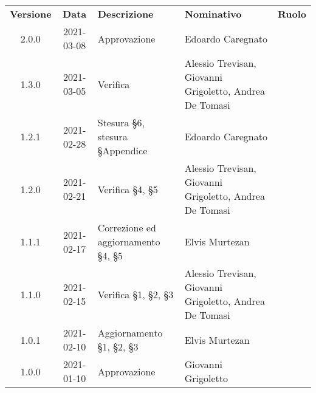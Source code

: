 {
    \renewcommand{\arraystretch}{1.5}
    \centering
    \begin{longtable}{ c c  C{3.5cm}  C{3.5cm}  c }
        \rowcolor{\primaryColor}
        \textcolor{\secondaryColor}{
        \textbf{Versione}}     & \textcolor{\secondaryColor}{\textbf{Data}}       & \textcolor{\secondaryColor}
        {\textbf{Descrizione}} & \textcolor{\secondaryColor}{\textbf{Nominativo}} & \textcolor{\secondaryColor}{\textbf{Ruolo}}                          \\



        2.0.0  & 
        2021-03-08  & 
        Approvazione& 
        Edoardo Caregnato & 
        \responsabile{} \\
        
        1.3.0  & 
        2021-03-05  & 
        Verifica& 
        Alessio Trevisan, Giovanni Grigoletto, Andrea De Tomasi & 
        \verificatore{} \\

        1.2.1  & 
        2021-02-28  & 
        Stesura §6, stesura §Appendice  & 
        Edoardo Caregnato & 
        \responsabile{} \\
        
        1.2.0  & 
        2021-02-21  & 
        Verifica §4, §5 & 
        Alessio Trevisan, Giovanni Grigoletto, Andrea De Tomasi & 
        \verificatore{} \\
        
        1.1.1  & 
        2021-02-17  & 
        Correzione ed aggiornamento §4, §5 & 
        Elvis Murtezan & 
        \responsabile{} \\

        1.1.0  & 
        2021-02-15  & 
        Verifica §1, §2, §3 & 
        Alessio Trevisan, Giovanni Grigoletto, Andrea De Tomasi & 
        \verificatore{} \\
        
        1.0.1  & 
        2021-02-10  & 
        Aggiornamento §1, §2, §3 & 
        Elvis Murtezan & 
        \responsabile{} \\

        1.0.0  & 
        2021-01-10  & 
        Approvazione & 
        Giovanni Grigoletto & 
        \responsabile{} \\


\end{longtable}}

